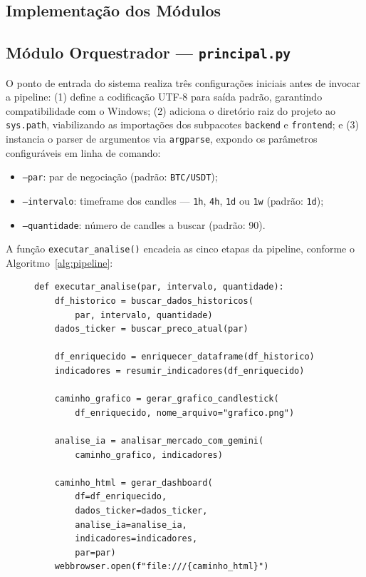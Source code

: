 \documentclass[conference]{IEEEtran}
\begin{document}
\subsection{Implementação dos Módulos}
\label{sec:implementacao}

\subsection{Módulo Orquestrador --- \texttt{principal.py}}

O ponto de entrada do sistema realiza três configurações iniciais antes de invocar a pipeline: (1) define a codificação UTF-8 para saída padrão, garantindo compatibilidade com o Windows; (2) adiciona o diretório raiz do projeto ao \texttt{sys.path}, viabilizando as importações dos subpacotes \texttt{backend} e \texttt{frontend}; e (3) instancia o parser de argumentos via \texttt{argparse}, expondo os parâmetros configuráveis em linha de comando:

\begin{itemize}
  \item \texttt{--par}: par de negociação (padrão: \texttt{BTC/USDT});
  \item \texttt{--intervalo}: timeframe dos candles — \texttt{1h}, \texttt{4h}, \texttt{1d} ou \texttt{1w} (padrão: \texttt{1d});
  \item \texttt{--quantidade}: número de candles a buscar (padrão: 90).
\end{itemize}

A função \texttt{executar\_analise()} encadeia as cinco etapas da pipeline, conforme o Algoritmo~\ref{alg:pipeline}:

\begin{figure}[H]
\begin{lstlisting}[caption={Pipeline principal do sistema CriptoIA.}, label={alg:pipeline}]
def executar_analise(par, intervalo, quantidade):
    df_historico = buscar_dados_historicos(
        par, intervalo, quantidade)
    dados_ticker = buscar_preco_atual(par)

    df_enriquecido = enriquecer_dataframe(df_historico)
    indicadores = resumir_indicadores(df_enriquecido)

    caminho_grafico = gerar_grafico_candlestick(
        df_enriquecido, nome_arquivo="grafico.png")

    analise_ia = analisar_mercado_com_gemini(
        caminho_grafico, indicadores)

    caminho_html = gerar_dashboard(
        df=df_enriquecido,
        dados_ticker=dados_ticker,
        analise_ia=analise_ia,
        indicadores=indicadores,
        par=par)
    webbrowser.open(f"file:///{caminho_html}")
\end{lstlisting}
\end{figure}
\end{document}
